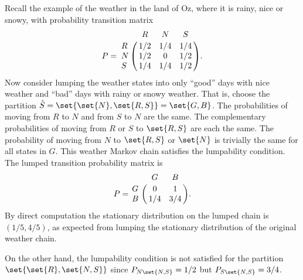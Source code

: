 \documentclass[12pt]{article}
\begin{document}
\begin{example}
    Recall the example of the weather in the land of Oz, where it is
    rainy, nice or snowy, with probability transition matrix
    \[
        P = \bordermatrix{ & R & N & S \cr
        R & 1/2 & 1/4 & 1/4 \cr
        N & 1/2 & 0 & 1/2 \cr
        S & 1/4 & 1/4 & 1/2 }.
    \] Now consider lumping the weather states into only ``good'' days
    with nice weather and ``bad'' days with rainy or snowy weather.
    That is, choose the partition \( \hat{S} = \set{ \set{N}, \set{R,S}}
    = \set{G, B} \).  The probabilities of moving from \( R \) to \( N \)
    and from \( S \) to \( N \) are the same.  The complementary
    probabilities of moving from \( R \) or \( S \) to \( \set{R, S} \)
    are each the same.  The probability of moving from \( N \) to \(
    \set{R, S} \) or \( \set{N} \) is trivially the same for all states
    in \( G \).  This weather Markov chain satisfies the lumpability
    condition.  The lumped transition probability matrix is
    \[
        P = \bordermatrix{ & G & B \cr
        G & 0 & 1 \cr
        B & 1/4 & 3/4}.
    \] By direct computation the stationary distribution on the lumped
    chain is \( (1/5, 4/5) \), as expected from lumping the stationary
    distribution of the original weather chain.

    On the other hand, the lumpability condition is not satisfied for
    the partition \( \set{ \set{R}, \set{N, S}} \) since \( P_ {N \set{N,
    S}} = 1/2 \) but \( P_{S \set{N,S}} = 3/4 \).
\end{example}
\end{document}
